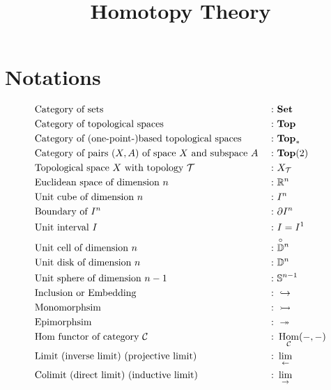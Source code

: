 \documentclass[a4paper]{article}
\theoremstyle{plain}
\theoremstyle{definition}
\theoremstyle{remark}
\newcommand{\mc}[1]{\mathcal{#1}}
\newcommand{\mbf}[1]{\mathbf{#1}}
\newcommand{\bbD}{\mathbb D}
\newcommand{\bbS}{\mathbb S}
\newcommand{\mcC}{\mc C}
\newcommand{\mcT}{\mc T}
\newcommand{\bbRn}{\mathbb R^n}
\newcommand{\unitcell}[1]{\overset{\!\!\!\! \circ}{\bbD^{#1}}}
\DeclareMathOperator{\Hom}{\rm{Hom}}
\begin{document}
    \title{Homotopy Theory}
    \author{{\color{pink}{Cloudi}}{\color{Aquamarine}{fold}}}
    \maketitle
    \newpage

    \section{Notations}

    \begin{align*}
        & \text{Category of sets } &: \ & \mbf{Set} \\
        & \text{Category of topological spaces }&: \ & \mbf{Top} \\
        & \text{Category of (one-point-)based topological spaces }&: \  & \mbf{Top}_* \\
        & \text{Category of pairs $(X,A)$ of space $X$ and subspace $A$ } &: \ & \mbf{Top}(2) \\
        & \text{Topological space $X$ with topology $\mcT$ } &: \ & X_{\mcT}\\
        & \text{Euclidean space of dimension $n$ } &: \ & \bbRn\\
        & \text{Unit cube of dimension $n$ } &: \ & I^n\\
        & \text{Boundary of $I^n$ }          &: \ & \partial I^n\\
        & \text{Unit interval $I$}           &: \ & I = I^1\\
        & \text{Unit cell of dimension $n$ } &: \ & \unitcell{n} \\
        & \text{Unit disk of dimension $n$ } &: \ & \bbD^n\\
        & \text{Unit sphere of dimension $n-1$ } &: \ & \bbS^{n-1}\\
        & \text{Inclusion or Embedding } &: \ & \hookrightarrow \\
        & \text{Monomorphsim }      &: \ & \rightarrowtail \\
        & \text{Epimorphsim }       &: \ & \twoheadrightarrow \\
        & \text{Hom functor of category $\mcC $} &: \ & \Hom_{\mcC}(-,-)\\
        & \text{Limit (inverse limit) (projective limit) } &: \ & \lim_{\leftarrow} \\
        & \text{Colimit (direct limit) (inductive limit) } &: \ & \lim_{\rightarrow} \\
    \end{align*}
\end{document}
